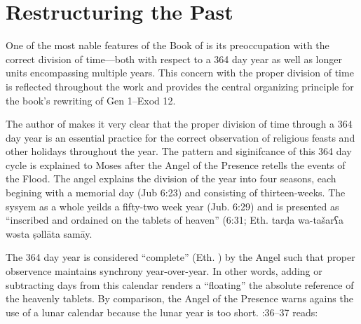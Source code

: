 
\section{Restructuring the Past}

One of the most nable features of the Book of \jub is its preoccupation with the correct division of time---both with respect to a 364 day year as well as longer units encompassing multiple years. This concern with the proper division of time is reflected throughout the work and provides the central organizing principle for the book's rewriting of Gen 1--Exod 12.

The author of \jub makes it very clear that the proper division of time through a 364 day year is an essential practice for the correct observation of religious feasts and other holidays throughout the year. The pattern and siginifcance of this 364 day cycle is explained to Moses after the Angel of the Presence retells the events of the Flood. The angel explains the division of the year into four seasons, each begining with a memorial day (Jub 6:23) and consisting of thirteen-weeks. The sysyem as a whole yeilds a fifty-two week year (Jub. 6:29) and is presented as ``inscribed and ordained on the tablets of heaven'' (6:31; Eth.
        {tarḍa wa-tašarʕa wəsta ṣəllāta samāy}.

The 364 day year is considered ``complete'' (Eth. \eth{}{}) by the Angel such that proper observence maintains synchrony year-over-year. In other words, adding or subtracting days from this calendar renders a ``floating'' \visavis the absolute reference of the heavenly tablets. By comparison, the Angel of the Presence warns agains the use of a lunar calendar because the lunar year is too short. :36--37 reads:

